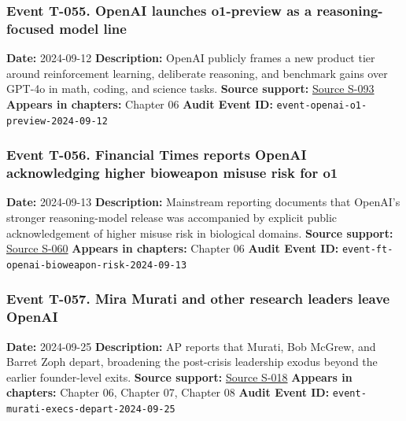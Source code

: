 \documentclass[
  american,
  11pt,
  letterpaper,
]{article}
\begin{document}
\subsubsection{Event T-055. OpenAI launches o1-preview as a
reasoning-focused model
line}\label{event-t-055-openai-launches-o1-preview-as-a-reasoning-focused-model-line}

\textbf{Date:} 2024-09-12 \textbf{Description:} OpenAI publicly frames a
new product tier around reinforcement learning, deliberate reasoning,
and benchmark gains over GPT-4o in math, coding, and science tasks.
\textbf{Source support:}
\hyperref[source-s-093-learning-to-reason-with-llms]{Source S-093}
\textbf{Appears in chapters:} Chapter 06 \textbf{Audit Event ID:}
\texttt{event-openai-o1-preview-2024-09-12}

\subsubsection{Event T-056. Financial Times reports OpenAI acknowledging
higher bioweapon misuse risk for
o1}\label{event-t-056-financial-times-reports-openai-acknowledging-higher-bioweapon-misuse-risk-for-o1}

\textbf{Date:} 2024-09-13 \textbf{Description:} Mainstream reporting
documents that OpenAI's stronger reasoning-model release was accompanied
by explicit public acknowledgement of higher misuse risk in biological
domains. \textbf{Source support:}
\hyperref[source-s-060-openai-acknowledges-new-models-increase-risk-of-misuse-to-create-bioweapons]{Source
S-060} \textbf{Appears in chapters:} Chapter 06 \textbf{Audit Event ID:}
\texttt{event-ft-openai-bioweapon-risk-2024-09-13}

\subsubsection{Event T-057. Mira Murati and other research leaders leave
OpenAI}\label{event-t-057-mira-murati-and-other-research-leaders-leave-openai}

\textbf{Date:} 2024-09-25 \textbf{Description:} AP reports that Murati,
Bob McGrew, and Barret Zoph depart, broadening the post-crisis
leadership exodus beyond the earlier founder-level exits. \textbf{Source
support:}
\hyperref[source-s-018-openai-chief-technology-officer-mira-murati-and-2-other-execs-are-leaving-the-chatgpt-maker]{Source
S-018} \textbf{Appears in chapters:} Chapter 06, Chapter 07, Chapter 08
\textbf{Audit Event ID:} \texttt{event-murati-execs-depart-2024-09-25}
\end{document}
